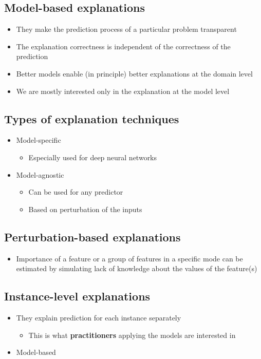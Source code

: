 \documentclass{article}
\begin{document}
    \subsection{Model-based explanations}
    \begin{itemize}
        \item They make the prediction process of a particular problem transparent
        \item The explanation correctness is independent of the correctness of the prediction
        \item Better models enable (in principle) better explanations at the domain level
        \item We are mostly interested only in the explanation at the model level
    \end{itemize}

    \subsection{Types of explanation techniques}
    \begin{itemize}
        \item Model-specific
        \begin{itemize}
            \item Especially used for deep neural networks
        \end{itemize}
        \item Model-agnostic
        \begin{itemize}
            \item Can be used for any predictor
            \item Based on perturbation of the inputs
        \end{itemize}
    \end{itemize}

    \subsection{Perturbation-based explanations}
    \begin{itemize}
        \item Importance of a feature or a group of features in a specific mode can be estimated by simulating lack of knowledge about the values of the feature(s)  %
    \end{itemize}

    \subsection{Instance-level explanations}
    \begin{itemize}
        \item They explain prediction for each instance separately
        \begin{itemize}
            \item This is what \textbf{practitioners} applying the models are interested in
        \end{itemize}
        \item Model-based
    \end{itemize}
\end{document}

